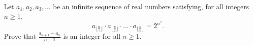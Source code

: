 Let $a_1, a_2, a_3, \dots$ be an infinite sequence of real numbers satisfying, for all integers $n \ge 1$,
$$a_{\lfloor \frac{n}{1}\rfloor} \cdot a_{\lfloor \frac{n}{2}\rfloor} \cdot \ldots
\cdot a_{\lfloor \frac{n}{n}\rfloor}= 2^{n^2}.$$
Prove that $\frac{a_{n+1}-a_n}{n+1}$ is an integer for all $n \geq 1$.
